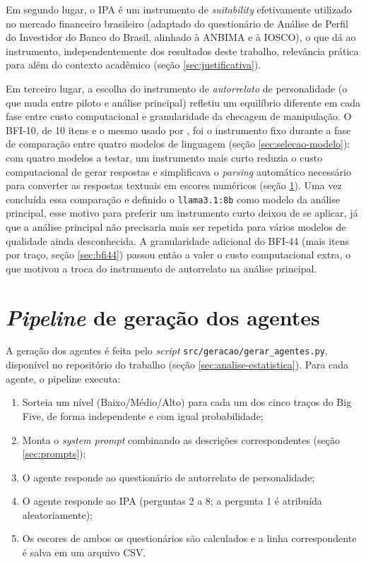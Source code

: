 Em segundo lugar, o IPA é um instrumento de \textit{suitability}
efetivamente utilizado no mercado financeiro brasileiro (adaptado do
questionário de Análise de Perfil do Investidor do Banco do Brasil,
alinhado à ANBIMA e à IOSCO), o que dá ao instrumento,
independentemente dos resultados deste trabalho, relevância prática para
além do contexto acadêmico (seção \ref{sec:justificativa}).

Em terceiro lugar, a escolha do instrumento de \textit{autorrelato} de
personalidade (o que muda entre piloto e análise principal) refletiu um
equilíbrio diferente em cada fase entre custo computacional e granularidade
da checagem de manipulação. O BFI-10, de 10 itens e o mesmo usado por
, foi o instrumento fixo durante a fase de
comparação entre quatro modelos de linguagem (seção
\ref{sec:selecao-modelo}): com quatro modelos a testar, um instrumento
mais curto reduzia o custo computacional de gerar respostas e
simplificava o \textit{parsing} automático necessário para converter as
respostas textuais em escores numéricos (seção \ref{sec:pipeline}). Uma
vez concluída essa comparação e definido o \texttt{llama3.1:8b} como
modelo da análise principal, esse motivo para preferir um instrumento
curto deixou de se aplicar, já que a análise principal não precisaria
mais ser repetida para vários modelos de qualidade ainda desconhecida. A granularidade adicional do
BFI-44 (mais itens por traço, seção \ref{sec:bfi44}) passou então a
valer o custo computacional extra, o que motivou a troca do instrumento
de autorrelato na análise principal.

\section{\textit{Pipeline} de geração dos agentes}
\label{sec:pipeline}

A geração dos agentes é feita pelo \textit{script} \texttt{src/geracao/gerar\_agentes.py}, disponível no repositório do trabalho (seção \ref{sec:analise-estatistica}). Para cada agente,
o pipeline executa:

\begin{enumerate}
    \item Sorteia um nível (Baixo/Médio/Alto) para cada um dos cinco traços do
    Big Five, de forma independente e com igual probabilidade;
    \item Monta o \textit{system prompt} combinando as descrições
    correspondentes (seção \ref{sec:prompts});
    \item O agente responde ao questionário de autorrelato de personalidade;
    \item O agente responde ao IPA (perguntas 2 a 8; a pergunta 1 é
    atribuída aleatoriamente);
    \item Os escores de ambos os questionários são calculados e a linha
    correspondente é salva em um arquivo CSV.
\end{enumerate}

